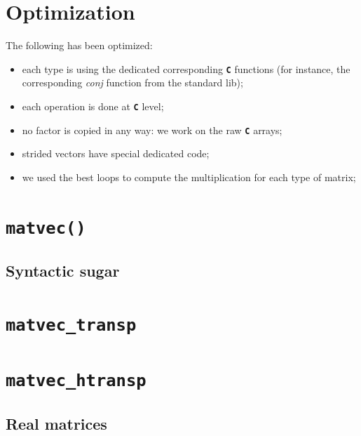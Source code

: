 \documentclass[letterpaper,10pt,english]{sphinxmanual}
\begin{document}
\section{Optimization}
\label{multiplication_with_numpy_vector:optimization}
The following has been optimized:
\begin{itemize}
\item {} 
each type is using the dedicated corresponding \textbf{\texttt{C}} functions (for instance, the corresponding \emph{conj} function from the standard lib);

\item {} 
each operation is done at \textbf{\texttt{C}} level;

\item {} 
no factor is copied in any way: we work on the raw \textbf{\texttt{C}} arrays;

\item {} 
strided vectors have special dedicated code;

\item {} 
we used the best loops to compute the multiplication for each type of matrix;

\end{itemize}


\section{\texttt{matvec()}}
\label{multiplication_with_numpy_vector:matvec}

\subsection{Syntactic sugar}
\label{multiplication_with_numpy_vector:syntactic-sugar}

\section{\texttt{matvec\_transp}}
\label{multiplication_with_numpy_vector:matvec-transp}

\section{\texttt{matvec\_htransp}}
\label{multiplication_with_numpy_vector:matvec-htransp}

\subsection{Real matrices}
\label{multiplication_with_numpy_vector:real-matrices}
\end{document}

